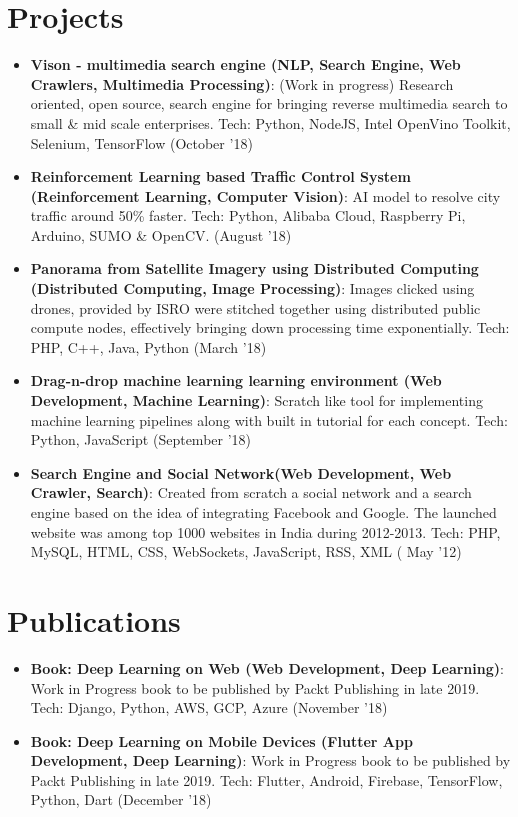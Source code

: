 \documentclass[a4paper,20pt]{article}
\newcommand{\resumeItem}[2]{
  \item\small{
    \textbf{#1}{: #2 \vspace{-2pt}}
  }
}
\newcommand{\resumeSubItem}[2]{\resumeItem{#1}{#2}\vspace{-3pt}}
\newcommand{\resumeSubHeadingListStart}{\begin{itemize}[leftmargin=*]}
\newcommand{\resumeSubHeadingListEnd}{\end{itemize}}
\begin{document}
\section{Projects}
\resumeSubHeadingListStart
\resumeSubItem{Vison - multimedia search engine (NLP, Search Engine, Web Crawlers, Multimedia Processing)}{(Work in progress) Research oriented, open source, search engine for bringing reverse multimedia search to small \& mid scale enterprises. Tech: Python, NodeJS, Intel OpenVino Toolkit, Selenium, TensorFlow (October '18)}
\vspace{2pt}
\resumeSubItem{Reinforcement Learning based Traffic Control System (Reinforcement Learning, Computer Vision)}{AI model to resolve city traffic around 50\%
faster. Tech: Python, Alibaba Cloud, Raspberry Pi, Arduino, SUMO \& OpenCV. (August '18)}
\vspace{2pt}
\resumeSubItem{Panorama from Satellite Imagery using Distributed Computing (Distributed Computing, Image Processing)}{Images clicked using drones, provided by ISRO were stitched together using distributed public compute nodes, effectively bringing down processing time exponentially. Tech: PHP, C++, Java, Python (March '18)}
\vspace{2pt}
\resumeSubItem{Drag-n-drop machine learning learning environment (Web Development, Machine Learning)}{Scratch like tool for implementing machine learning pipelines along with built in tutorial for each concept. Tech: Python, JavaScript (September '18)}
\vspace{2pt}
\resumeSubItem{Search Engine and Social Network(Web Development, Web Crawler, Search)}{Created from scratch a social network and a search engine based on the idea of integrating Facebook and Google. The launched website was among top 1000 websites in India during 2012-2013. Tech: PHP, MySQL, HTML, CSS, WebSockets, JavaScript, RSS, XML ( May '12)}
\resumeSubHeadingListEnd
\vspace{-5pt}
\section{Publications}
\resumeSubHeadingListStart
\resumeSubItem{Book: Deep Learning on Web (Web Development, Deep Learning)}{Work in Progress book to be published by Packt Publishing in late 2019. Tech: Django, Python, AWS, GCP, Azure (November '18)}
\vspace{2pt}
\resumeSubItem{Book: Deep Learning on Mobile Devices (Flutter App Development, Deep Learning)}{Work in Progress book to be published by Packt Publishing in late 2019. Tech: Flutter, Android, Firebase, TensorFlow, Python, Dart (December '18)}
\resumeSubHeadingListEnd
\vspace{-5pt}
\end{document}
